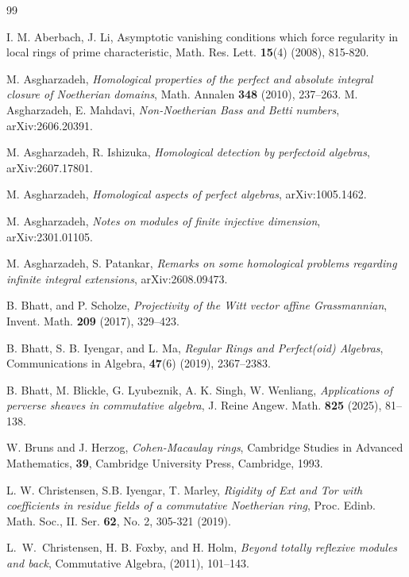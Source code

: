 \documentclass[11pt,a4paper]{amsart}
\numberwithin{equation}{section}
\theoremstyle{definition}
\theoremstyle{remark}
\begin{document}
	\begin{thebibliography}{99}

I. M. Aberbach, J. Li, Asymptotic vanishing conditions which force regularity in local rings of prime
characteristic, Math. Res. Lett. {\bf 15}(4)  (2008), 815-820.

M. Asgharzadeh, \emph{Homological properties of the perfect and absolute integral closure of Noetherian domains}, Math. Annalen {\bf 348} (2010), 237--263.
M. Asgharzadeh, E. Mahdavi, \emph{Non-Noetherian Bass and Betti numbers},   arXiv:2606.20391.

M. Asgharzadeh, R. Ishizuka, 
\emph{Homological detection by perfectoid algebras},  	arXiv:2607.17801.


 M. Asgharzadeh,   \emph{Homological aspects of perfect algebras}, arXiv:1005.1462.

 
	 M.
	Asgharzadeh,     \emph{Notes on modules of finite injective dimension}, arXiv:2301.01105.

		
 M. Asgharzadeh,  S. Patankar, {\it Remarks on some homological problems regarding infinite integral extensions}, arXiv:2608.09473.

B. Bhatt, and P. Scholze,  \emph{Projectivity of the Witt vector affine Grassmannian}, Invent. Math. {\bf{209}} (2017),  329--423.
	
B. Bhatt, S. B. Iyengar, and L. Ma, \emph{Regular Rings and Perfect(oid) Algebras}, Communications in Algebra, \textbf{47}(6) (2019), 2367--2383.

	B.	Bhatt, M. Blickle, G. Lyubeznik, A. K. Singh, W.  Wenliang,
		\emph{Applications of perverse sheaves in commutative algebra},
		J. Reine Angew. Math. {\bf{825}} (2025), 81–138.
	
		
 W. Bruns and J. Herzog, \emph{Cohen-Macaulay rings}, Cambridge Studies in Advanced Mathematics, {\bf 39}, Cambridge University Press, Cambridge, 1993.

 L. W. Christensen, S.B. Iyengar, T. Marley,  
		\emph{Rigidity of Ext and Tor with coefficients in residue fields of a commutative Noetherian ring},
		Proc. Edinb. Math. Soc., II. Ser. {\bf 62}, No. 2, 305-321 (2019).


L.~W.~Christensen, 
 H. B. Foxby, and 
H. Holm, 
\emph{Beyond totally reflexive modules and back},  {Commutative Algebra}, ({2011}),  {{101}--{143}}.


\end{thebibliography}
\end{document}
